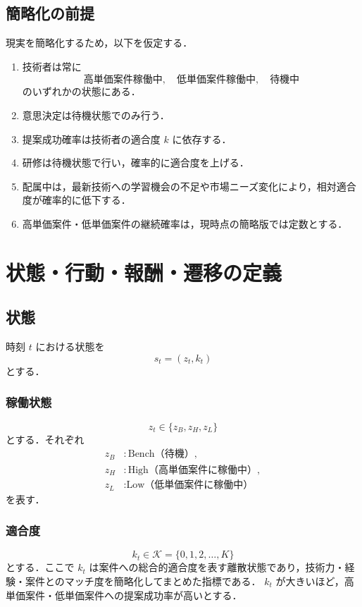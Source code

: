 \documentclass[11pt,a4paper]{bxjsarticle}
\begin{document}
\subsection{簡略化の前提}
現実を簡略化するため，以下を仮定する．
\begin{enumerate}[leftmargin=2em,label=(\arabic*)]
    \item 技術者は常に
    \[
        \text{高単価案件稼働中},\quad \text{低単価案件稼働中},\quad \text{待機中}
    \]
    のいずれかの状態にある．
    \item 意思決定は待機状態でのみ行う．
    \item 提案成功確率は技術者の適合度 \(k\) に依存する．
    \item 研修は待機状態で行い，確率的に適合度を上げる．
    \item 配属中は，最新技術への学習機会の不足や市場ニーズ変化により，相対適合度が確率的に低下する．
    \item 高単価案件・低単価案件の継続確率は，現時点の簡略版では定数とする．
\end{enumerate}

\section{状態・行動・報酬・遷移の定義}

\subsection{状態}

時刻 \(t\) における状態を
\[
    s_t = (z_t, k_t)
\]
とする．

\subsubsection*{稼働状態}
\[
    z_t \in \{z_B, z_H, z_L\}
\]
とする．それぞれ
\begin{align*}
    z_B &: \text{Bench（待機）},\\
    z_H &: \text{High（高単価案件に稼働中）},\\
    z_L &: \text{Low（低単価案件に稼働中）}
\end{align*}
を表す．

\subsubsection*{適合度}
\[
    k_t \in \mathcal{K}=\{0,1,2,\dots,K\}
\]
とする．ここで \(k_t\) は案件への総合的適合度を表す離散状態であり，技術力・経験・案件とのマッチ度を簡略化してまとめた指標である．
\(k_t\) が大きいほど，高単価案件・低単価案件への提案成功率が高いとする．
\end{document}
